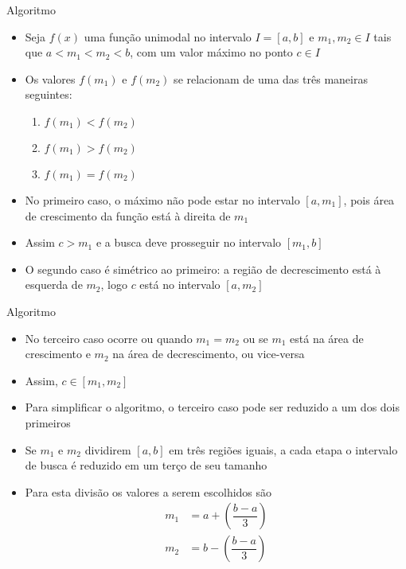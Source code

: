 \begin{frame}[fragile]{Algoritmo}

    \begin{itemize}
        \item Seja $f(x)$ uma função unimodal no intervalo $I = [a, b]$ e $m_1, m_2\in I$ tais
            que $a < m_1 < m_2 < b$, com um valor máximo no ponto $c\in I$

        \item Os valores $f(m_1)$ e $f(m_2)$ se relacionam de uma das três maneiras seguintes:
        \begin{enumerate}
            \item $f(m_1) < f(m_2)$
            \item $f(m_1) > f(m_2)$
            \item $f(m_1) = f(m_2)$
        \end{enumerate}

        \item No primeiro caso, o máximo não pode estar no intervalo $[a, m_1]$, pois 
            área de crescimento da função está à direita de $m_1$

        \item Assim $c > m_1$ e a busca deve prosseguir no intervalo $[m_1, b]$

        \item O segundo caso é simétrico ao primeiro: a região de decrescimento está à 
            esquerda de $m_2$, logo $c$ está no intervalo $[a, m_2]$
    \end{itemize}

\end{frame}

\begin{frame}[fragile]{Algoritmo}

    \begin{itemize}
        \item No terceiro caso ocorre ou quando $m_1 = m_2$ ou se $m_1$ está na área de crescimento
            e $m_2$ na área de decrescimento, ou vice-versa

        \item Assim, $c\in [m_1, m_2]$

        \item Para simplificar o algoritmo, o terceiro caso pode ser reduzido a um dos dois
            primeiros

        \item Se $m_1$ e $m_2$ dividirem $[a, b]$ em três regiões iguais, a cada etapa
            o intervalo de busca é reduzido em um terço de seu tamanho

        \item Para esta divisão os valores a serem escolhidos são
        \begin{align*}
            m_1 &= a + \left(\dfrac{b - a}{3}\right) \\
            m_2 &= b - \left(\dfrac{b - a}{3}\right)
        \end{align*}
    \end{itemize}

\end{frame}

